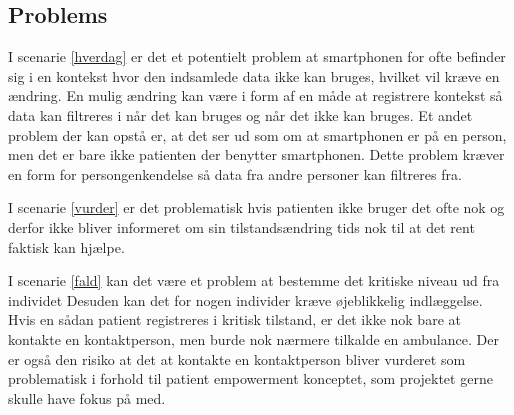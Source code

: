 \subsection{Problems}
I scenarie \ref{hverdag} er det et potentielt problem at smartphonen for ofte befinder sig i en kontekst hvor den indsamlede data ikke kan bruges, hvilket vil kræve en ændring.
En mulig ændring kan være i form af en måde at registrere kontekst så data kan filtreres i når det kan bruges og når det ikke kan bruges.
Et andet problem der kan opstå er, at det ser ud som om at smartphonen er på en person, men det er bare ikke patienten der benytter smartphonen.
Dette problem kræver en form for persongenkendelse så data fra andre personer kan filtreres fra.

I scenarie \ref{vurder} er det problematisk hvis patienten ikke bruger det ofte nok og derfor ikke bliver informeret om sin tilstandsændring tids nok til at det rent faktisk kan hjælpe.

I scenarie \ref{fald} kan det være et problem at bestemme det kritiske niveau ud fra individet
Desuden kan det for nogen individer kræve øjeblikkelig indlæggelse.
Hvis en sådan patient registreres i kritisk tilstand, er det ikke nok bare at kontakte en kontaktperson, men burde nok nærmere tilkalde en ambulance.
Der er også den risiko at det at kontakte en kontaktperson bliver vurderet som problematisk i forhold til patient empowerment konceptet, som projektet gerne skulle have fokus på med. 

